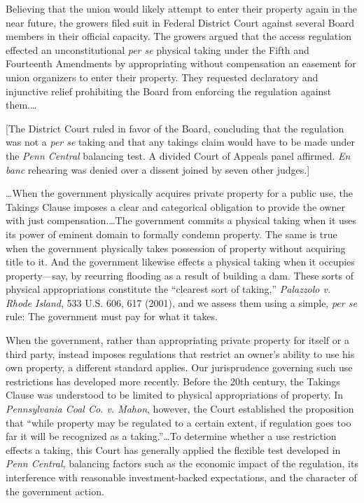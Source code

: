 Believing that the union would likely attempt to enter their property again in
the near future, the growers filed suit in Federal District Court against
several Board members in their official capacity. The growers argued that the
access regulation effected an unconstitutional \textit{per se} physical taking
under the Fifth and Fourteenth Amendments by appropriating without compensation
an easement for union organizers to enter their property. They requested
declaratory and injunctive relief prohibiting the Board from enforcing the
regulation against them.\ldots


[The District Court ruled in favor of the Board, concluding that the regulation
was not a \textit{per se} taking and that any takings claim would have to be
made under the \textit{Penn Central} balancing test. A divided Court of Appeals
panel affirmed. \textit{En banc} rehearing was denied over a dissent joined by
seven other judges.]





\ldots When the government physically acquires private property for a public
use, the Takings Clause imposes a clear and categorical obligation to provide
the owner with just compensation.\ldots The government commits a physical taking
when it uses its power of eminent domain to formally condemn property. The same
is true when the government physically takes possession of property without
acquiring title to it. And the government likewise effects a physical taking
when it occupies property---say, by recurring flooding as a result of building a
dam. These sorts of physical appropriations constitute the ``clearest sort of
taking,'' \textit{Palazzolo v. Rhode Island}, 533 U.S. 606, 617 (2001), and we
assess them using a simple, \textit{per se} rule: The government must pay for
what it takes.


When the government, rather than appropriating private property for itself or a
third party, instead imposes regulations that restrict an owner's ability to use
his own property, a different standard applies. Our jurisprudence governing such
use restrictions has developed more recently. Before the 20th century, the
Takings Clause was understood to be limited to physical appropriations of
property. In \textit{Pennsylvania Coal Co. v. Mahon}, however, the Court
established the proposition that ``while property may be regulated to a certain
extent, if regulation goes too far it will be recognized as a taking.''\ldots To
determine whether a use restriction effects a taking, this Court has generally
applied the flexible test developed in \textit{Penn Central}, balancing factors
such as the economic impact of the regulation, its interference with reasonable
investment-backed expectations, and the character of the government action. 


